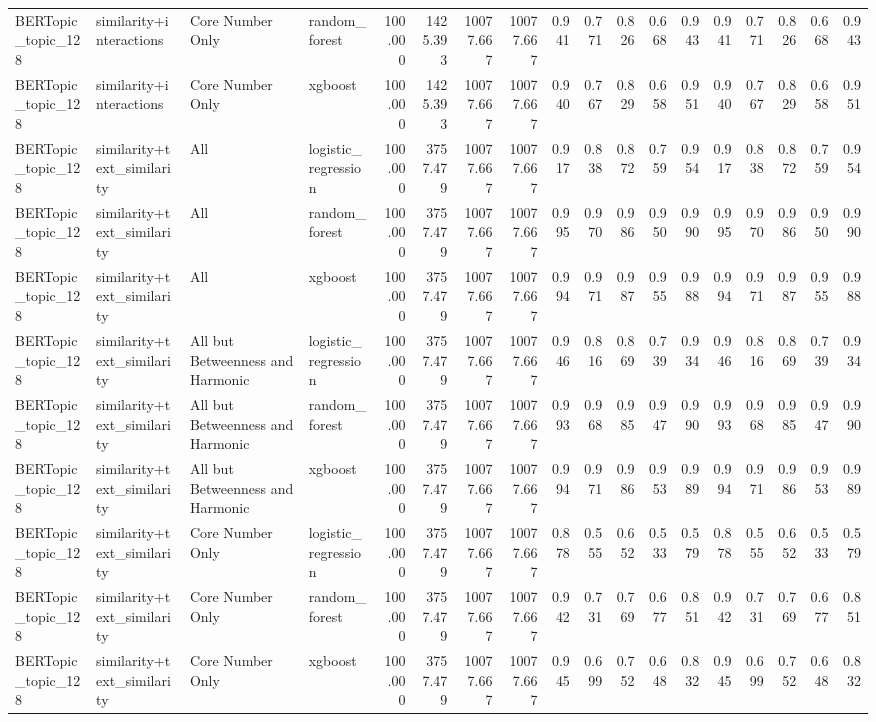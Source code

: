 \begin{tabular}{llllrrrrrrrrrrrrrr}
BERTopic_topic_128 & similarity+interactions & Core Number Only & random_forest & 100.000 & 1425.393 & 10077.667 & 10077.667 & 0.941 & 0.771 & 0.826 & 0.668 & 0.943 & 0.941 & 0.771 & 0.826 & 0.668 & 0.943 \\
BERTopic_topic_128 & similarity+interactions & Core Number Only & xgboost & 100.000 & 1425.393 & 10077.667 & 10077.667 & 0.940 & 0.767 & 0.829 & 0.658 & 0.951 & 0.940 & 0.767 & 0.829 & 0.658 & 0.951 \\
BERTopic_topic_128 & similarity+text_similarity & All & logistic_regression & 100.000 & 3757.479 & 10077.667 & 10077.667 & 0.917 & 0.838 & 0.872 & 0.759 & 0.954 & 0.917 & 0.838 & 0.872 & 0.759 & 0.954 \\
BERTopic_topic_128 & similarity+text_similarity & All & random_forest & 100.000 & 3757.479 & 10077.667 & 10077.667 & 0.995 & 0.970 & 0.986 & 0.950 & 0.990 & 0.995 & 0.970 & 0.986 & 0.950 & 0.990 \\
BERTopic_topic_128 & similarity+text_similarity & All & xgboost & 100.000 & 3757.479 & 10077.667 & 10077.667 & 0.994 & 0.971 & 0.987 & 0.955 & 0.988 & 0.994 & 0.971 & 0.987 & 0.955 & 0.988 \\
BERTopic_topic_128 & similarity+text_similarity & All but Betweenness and Harmonic & logistic_regression & 100.000 & 3757.479 & 10077.667 & 10077.667 & 0.946 & 0.816 & 0.869 & 0.739 & 0.934 & 0.946 & 0.816 & 0.869 & 0.739 & 0.934 \\
BERTopic_topic_128 & similarity+text_similarity & All but Betweenness and Harmonic & random_forest & 100.000 & 3757.479 & 10077.667 & 10077.667 & 0.993 & 0.968 & 0.985 & 0.947 & 0.990 & 0.993 & 0.968 & 0.985 & 0.947 & 0.990 \\
BERTopic_topic_128 & similarity+text_similarity & All but Betweenness and Harmonic & xgboost & 100.000 & 3757.479 & 10077.667 & 10077.667 & 0.994 & 0.971 & 0.986 & 0.953 & 0.989 & 0.994 & 0.971 & 0.986 & 0.953 & 0.989 \\
BERTopic_topic_128 & similarity+text_similarity & Core Number Only & logistic_regression & 100.000 & 3757.479 & 10077.667 & 10077.667 & 0.878 & 0.555 & 0.652 & 0.533 & 0.579 & 0.878 & 0.555 & 0.652 & 0.533 & 0.579 \\
BERTopic_topic_128 & similarity+text_similarity & Core Number Only & random_forest & 100.000 & 3757.479 & 10077.667 & 10077.667 & 0.942 & 0.731 & 0.769 & 0.677 & 0.851 & 0.942 & 0.731 & 0.769 & 0.677 & 0.851 \\
BERTopic_topic_128 & similarity+text_similarity & Core Number Only & xgboost & 100.000 & 3757.479 & 10077.667 & 10077.667 & 0.945 & 0.699 & 0.752 & 0.648 & 0.832 & 0.945 & 0.699 & 0.752 & 0.648 & 0.832 \\

\end{tabular}
